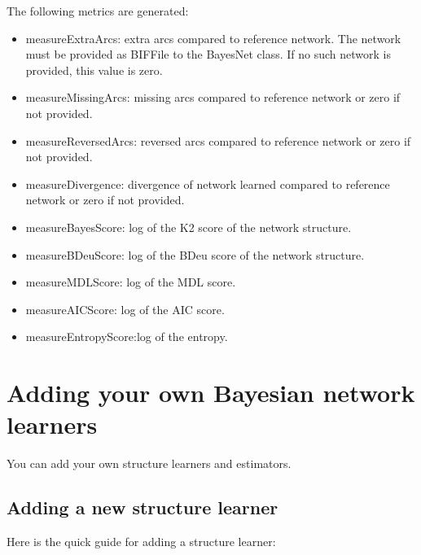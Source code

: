\documentclass{article}
\begin{document}
The following metrics are generated:
\begin{itemize}
\item measureExtraArcs: extra arcs compared to reference network. The network must be
provided as BIFFile to the BayesNet class. If no such network is provided, this value is zero.
\item measureMissingArcs: missing arcs compared to reference network or zero if not provided.
\item measureReversedArcs: reversed arcs compared to reference network or zero if not provided.
\item measureDivergence: divergence of network learned compared to reference network or zero if not provided.
\item measureBayesScore: log of the K2 score of the network structure.
\item measureBDeuScore: log of the BDeu score of the network structure.
\item measureMDLScore: log of the MDL score.
\item measureAICScore: log of the AIC score.
\item measureEntropyScore:log of the entropy.
\end{itemize}


\section{Adding your own Bayesian network learners}

You can add your own structure learners and estimators.

\subsection*{Adding a new structure learner}

Here is the quick guide for adding a structure learner:
\end{document}
